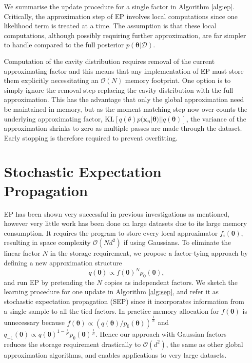 We summarise the update procedure for a single factor in Algorithm \ref{alg:ep}. Critically, the approximation step of EP involves local computations since one likelihood term is treated at a time. The assumption is that these local computations, although possibly requiring further approximation, are far simpler to handle compared to the full posterior $p(\bm{\theta}| \mathcal{D})$. 

Computation of the cavity distribution requires removal of the current approximating factor and this means that any implementation of EP must store them explicitly necessitating an $\mathcal{O}(N)$ memory footprint. One option is to simply ignore the removal step replacing the cavity distribution with the full approximation. This has the advantage that only the global approximation need be maintained in memory, but as the moment matching step now over-counts the underlying approximating factor, $\mathrm{KL}[q(\theta) p(\bm{x}_n | \bm{\theta}) || q(\bm{\theta})]$, the variance of the approximation shrinks to zero as multiple passes are made through the dataset. Early stopping is therefore required to prevent overfitting.

\section{Stochastic Expectation Propagation}

EP has been shown very successful in previous investigations as mentioned, however very little work has been done on large datasets due to its large memory consumption. It requires the program to store every local approximator $f_i(\bm{\theta})$, resulting in space complexity $\mathcal{O}(Nd^2)$ if using Gaussians. To eliminate the linear factor $N$ in the storage requirement, we propose a factor-tying approach by defining a new approximation structure
\begin{equation}
q(\bm{\theta}) \propto f(\bm{\theta})^N p_0(\bm{\theta}),
\end{equation}
and run EP by pretending the $N$ copies as independent factors. We sketch the learning procedure for one update in Algorithm \ref{alg:sep}, and refer it as stochastic expectation propagation (SEP) since it incorporates information from a single sample to all the tied factors. In practice memory allocation for $f(\bm{\theta})$ is unnecessary because $f(\bm{\theta}) \propto (q(\bm{\theta}) / p_0(\bm{\theta}))^{\frac{1}{N}}$ and $q_{-1}(\bm{\theta}) \propto q(\bm{\theta})^{1 - \frac{1}{N}} p_0(\bm{\theta})^{\frac{1}{N}}$. Hence our approach with Gaussian factors reduces the storage requirement drastically to $\mathcal{O}(d^2)$, the same as other global approximation algorithms, and enables applications to very large datasets. 

